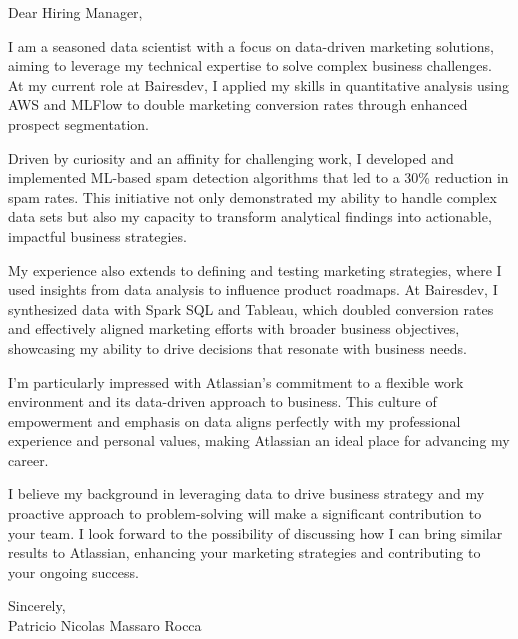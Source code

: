 \documentclass{article}
\begin{document}
\noindent Dear Hiring Manager,


I am a seasoned data scientist with a focus on data-driven marketing solutions, aiming to leverage my technical expertise to solve complex business challenges. At my current role at Bairesdev, I applied my skills in quantitative analysis using AWS and MLFlow to double marketing conversion rates through enhanced prospect segmentation.


Driven by curiosity and an affinity for challenging work, I developed and implemented ML-based spam detection algorithms that led to a 30\% reduction in spam rates. This initiative not only demonstrated my ability to handle complex data sets but also my capacity to transform analytical findings into actionable, impactful business strategies.


My experience also extends to defining and testing marketing strategies, where I used insights from data analysis to influence product roadmaps. At Bairesdev, I synthesized data with Spark SQL and Tableau, which doubled conversion rates and effectively aligned marketing efforts with broader business objectives, showcasing my ability to drive decisions that resonate with business needs.


I'm particularly impressed with Atlassian’s commitment to a flexible work environment and its data-driven approach to business. This culture of empowerment and emphasis on data aligns perfectly with my professional experience and personal values, making Atlassian an ideal place for advancing my career.


I believe my background in leveraging data to drive business strategy and my proactive approach to problem-solving will make a significant contribution to your team. I look forward to the possibility of discussing how I can bring similar results to Atlassian, enhancing your marketing strategies and contributing to your ongoing success.

\vspace{1cm}
\setlength{\parskip}{0em}
\begin{flushright}
Sincerely,\\
Patricio Nicolas Massaro Rocca
\end{flushright}
\end{document}
